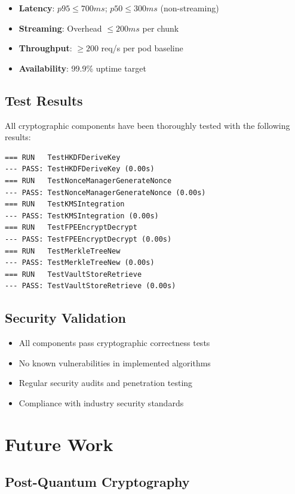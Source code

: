 \documentclass[12pt]{article}
\begin{document}
\begin{itemize}
    \item \textbf{Latency}: $p95 \leq 700ms$; $p50 \leq 300ms$ (non-streaming)
    \item \textbf{Streaming}: Overhead $\leq 200ms$ per chunk
    \item \textbf{Throughput}: $\geq 200$ req/s per pod baseline
    \item \textbf{Availability}: 99.9\% uptime target
\end{itemize}

\subsection{Test Results}

All cryptographic components have been thoroughly tested with the following results:

\begin{lstlisting}
=== RUN   TestHKDFDeriveKey
--- PASS: TestHKDFDeriveKey (0.00s)
=== RUN   TestNonceManagerGenerateNonce
--- PASS: TestNonceManagerGenerateNonce (0.00s)
=== RUN   TestKMSIntegration
--- PASS: TestKMSIntegration (0.00s)
=== RUN   TestFPEEncryptDecrypt
--- PASS: TestFPEEncryptDecrypt (0.00s)
=== RUN   TestMerkleTreeNew
--- PASS: TestMerkleTreeNew (0.00s)
=== RUN   TestVaultStoreRetrieve
--- PASS: TestVaultStoreRetrieve (0.00s)
\end{lstlisting}

\subsection{Security Validation}

\begin{itemize}
    \item All components pass cryptographic correctness tests
    \item No known vulnerabilities in implemented algorithms
    \item Regular security audits and penetration testing
    \item Compliance with industry security standards
\end{itemize}

\section{Future Work}

\subsection{Post-Quantum Cryptography}
\end{document}
